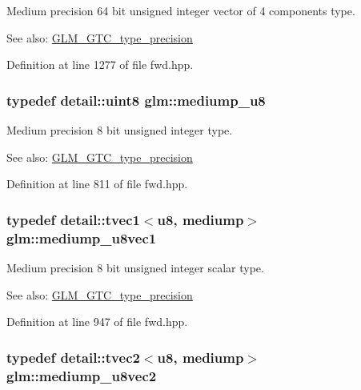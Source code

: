 Medium precision 64 bit unsigned integer vector of 4 components type. \begin{Desc}
\item[See also:]\hyperlink{group__gtc__type__precision}{GLM\_\-GTC\_\-type\_\-precision} \end{Desc}


Definition at line 1277 of file fwd.hpp.\hypertarget{group__gtc__type__precision_gc04b372784392e82bd557f300c4de097}{
\subsubsection[mediump\_\-u8]{\setlength{\rightskip}{0pt plus 5cm}typedef detail::uint8 {\bf glm::mediump\_\-u8}}}
\label{group__gtc__type__precision_gc04b372784392e82bd557f300c4de097}


Medium precision 8 bit unsigned integer type. \begin{Desc}
\item[See also:]\hyperlink{group__gtc__type__precision}{GLM\_\-GTC\_\-type\_\-precision} \end{Desc}


Definition at line 811 of file fwd.hpp.\hypertarget{group__gtc__type__precision_gdefca284b7a5980fb6be735abb77395e}{
\subsubsection[mediump\_\-u8vec1]{\setlength{\rightskip}{0pt plus 5cm}typedef detail::tvec1$<$u8, mediump$>$ {\bf glm::mediump\_\-u8vec1}}}
\label{group__gtc__type__precision_gdefca284b7a5980fb6be735abb77395e}


Medium precision 8 bit unsigned integer scalar type. \begin{Desc}
\item[See also:]\hyperlink{group__gtc__type__precision}{GLM\_\-GTC\_\-type\_\-precision} \end{Desc}


Definition at line 947 of file fwd.hpp.\hypertarget{group__gtc__type__precision_g5e20c1315bc1fecc867bc74525bea2ab}{
\subsubsection[mediump\_\-u8vec2]{\setlength{\rightskip}{0pt plus 5cm}typedef detail::tvec2$<$u8, mediump$>$ {\bf glm::mediump\_\-u8vec2}}}
\label{group__gtc__type__precision_g5e20c1315bc1fecc867bc74525bea2ab}


